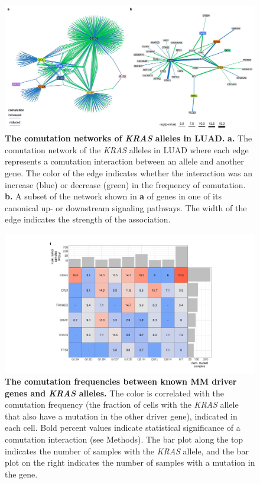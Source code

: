 \documentclass[english, 10pt, letterpaper]{article}
\newcommand{\KRAS}{\emph{KRAS}}
\begin{document}
\begin{figure}[h!]
\centering
\includegraphics[width=180mm]{figures/Supp_Fig_3.jpeg}
\caption{
    \textbf{The comutation networks of \KRAS{} alleles in LUAD.}
    \textbf{a.} The comutation network of the \KRAS{} alleles in LUAD where each edge represents a comutation interaction between an allele and another gene. The color of the edge indicates whether the interaction was an increase (blue) or decrease (green) in the frequency of comutation.
    \textbf{b.} A subset of the network shown in \textbf{a} of genes in one of its canonical up- or downstream signaling pathways. The width of the edge indicates the strength of the association.
}
\label{sfig:luad-comutation-network}
\end{figure}
\newpage


\begin{figure}[h!]
\centering
\includegraphics[width=180mm]{figures/Supp_Fig_4.jpeg}
\caption{
    \textbf{The comutation frequencies between known MM driver genes and \KRAS{} alleles.} The color is correlated with the comutation frequency (the fraction of cells with the \KRAS{} allele that also have a mutation in the other driver gene), indicated in each cell. Bold percent values indicate statistical significance of a comutation interaction (see Methods). The bar plot along the top indicates the number of samples with the \KRAS{} allele, and the bar plot on the right indicates the number of samples with a mutation in the gene.
}
\label{sfig:mm-comutation-heatmap}
\end{figure}
\newpage
\end{document}

